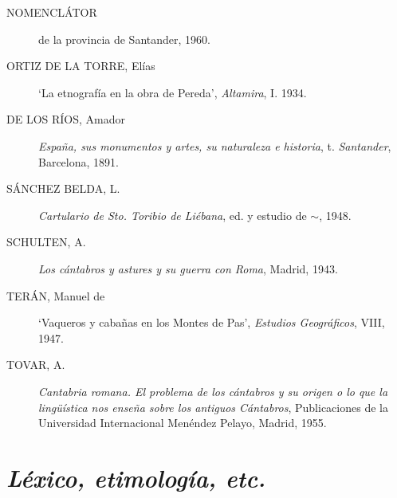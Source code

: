 \begin{description}
\item[NOMENCLÁTOR] de la provincia de Santander, 1960.
\item[ORTIZ DE LA TORRE, Elías] `La etnografía en la obra de Pereda', \textit{Altamira}, I. 1934.
\item[DE LOS RÍOS, Amador] \textit{España, sus monumentos y artes, su naturaleza e historia}, t. \textit{Santander}, Barcelona, 1891. 
\item[SÁNCHEZ BELDA, L.] \textit{Cartulario de Sto. Toribio de Liébana}, ed. y estudio de $\sim$, 1948.
\item[SCHULTEN, A.] \textit{Los cántabros y astures y su guerra con Roma}, Madrid, 1943. 
\item[TERÁN, Manuel de] `Vaqueros y cabañas en los Montes de Pas', \textit{Estudios Geográficos}, VIII, 1947.
\item[TOVAR, A.] \textit{Cantabria romana. El problema de los cántabros y su origen o lo que la lingüística nos enseña sobre los antiguos Cántabros}, Publicaciones de la Universidad Internacional Menéndez Pelayo, Madrid, 1955.
\end{description}

\section{\emph{Léxico, etimología, etc.}}

